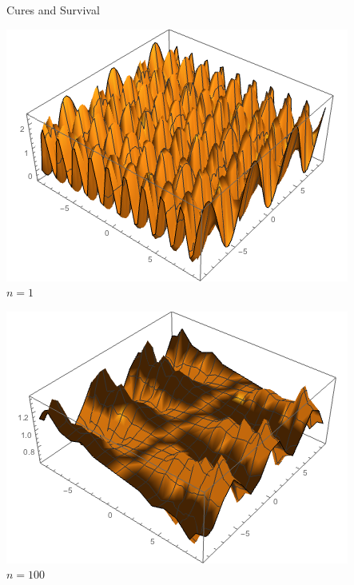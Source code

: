 \documentclass{beamer}
\begin{document}
\begin{frame}{Cures and Survival}
\begin{center}

\begin{minipage}{0.4\textwidth}
\includegraphics[scale=0.3]{cure_01}\\
$n=1$
\end{minipage}
\begin{minipage}{0.4\textwidth}
\pause\includegraphics[scale=0.3]{cure_02}\\
$n=100$
\end{minipage}


\end{center}
\end{frame}
\end{document}
